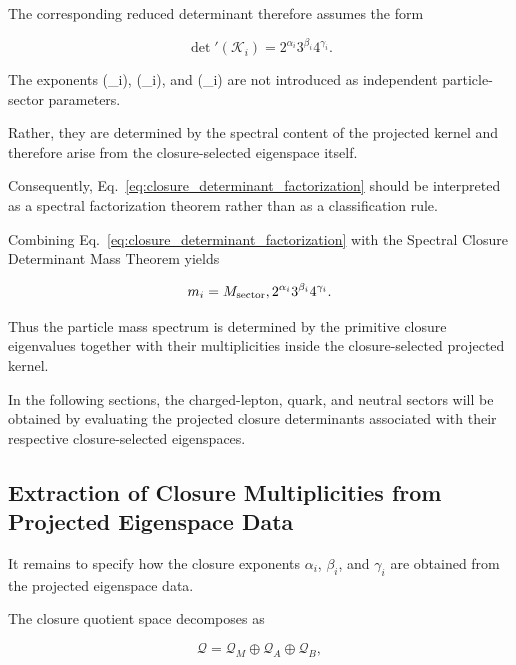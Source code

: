 \documentclass[11pt]{article}
\theoremstyle{definition}
\theoremstyle{remark}
\begin{document}
The corresponding reduced determinant therefore assumes the form

\begin{equation}
\det{}'(\mathcal K_i) =
2^{\alpha_i}
3^{\beta_i}
4^{\gamma_i}.
\label{eq:closure_determinant_factorization}
\end{equation}

The exponents
(\alpha_i),
(\beta_i),
and
(\gamma_i)
are not introduced as independent particle-sector parameters.

Rather, they are determined by the spectral content of the
projected kernel and therefore arise from the closure-selected
eigenspace itself.

Consequently, Eq.~\eqref{eq:closure_determinant_factorization}
should be interpreted as a spectral factorization theorem rather
than as a classification rule.

Combining
Eq.~\eqref{eq:closure_determinant_factorization}
with the Spectral Closure Determinant Mass Theorem yields

\begin{equation}
m_i =
M_{\rm sector}
,2^{\alpha_i}
3^{\beta_i}
4^{\gamma_i}.
\label{eq:spectral_mass_factorization}
\end{equation}

Thus the particle mass spectrum is determined by the primitive
closure eigenvalues together with their multiplicities inside
the closure-selected projected kernel.

In the following sections, the charged-lepton, quark, and
neutral sectors will be obtained by evaluating the projected
closure determinants associated with their respective
closure-selected eigenspaces.



\subsection{Extraction of Closure Multiplicities from Projected Eigenspace Data}
\label{subsec:closure_multiplicity_extraction}

It remains to specify how the closure exponents
\(\alpha_i\), \(\beta_i\), and \(\gamma_i\) are obtained from
the projected eigenspace data.

The closure quotient space decomposes as

\begin{equation}
\mathcal Q = 
\mathcal Q_M
\oplus
\mathcal Q_A
\oplus
\mathcal Q_B,
\end{equation}
\end{document}
